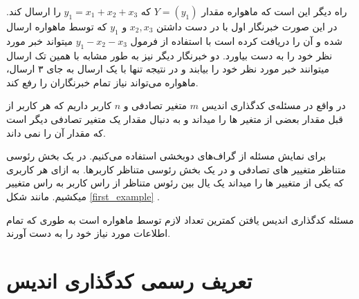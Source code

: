 راه دیگر این است که ماهواره مقدار
$Y = (y_1)$
که
$y_1 = x_1 + x_2 + x_3$
را ارسال کند. در این صورت خبرنگار اول با در دست داشتن
$x_2, x_3$
و 
$y_1$
که توسط ماهواره ارسال شده و آن را دریافت کرده است با استفاده از فرمول
$y_1 - x_2 - x_3$
میتواند خبر مورد نظر خود را به دست بیاورد. دو خبرنگار دیگر نیز به طور مشابه با همین تک ارسال میتوانند خبر مورد نظر خود را بیابند و در نتیجه تنها با یک ارسال به جای ۳ ارسال، ماهواره می‌تواند نیاز تمام خبرنگاران را رفع کند.

در واقع در مسئله‌ی کدگذاری اندیس
$m$
متغیر تصادفی و
$n$
کاربر داریم که هر کاربر از قبل مقدار بعضی از متغیر ها را میداند و به دنبال مقدار یک متغیر تصادفی دیگر است که مقدار آن را نمی داند.

برای نمایش مسئله از گراف‌های دوبخشی استفاده می‌کنیم. در یک بخش رئوسی متناظر متغییر های تصادفی و در یک بخش رئوسی متناظر کاربرها. به ازای هر کاربری که یکی از متغییر ها را میداند یک یال بین رئوس متناظر از راس کاربر به راس متغییر میکشیم. مانند شکل
\ref{first_example}
.

مسئله کدگذاری اندیس یافتن کمترین تعداد
لازم توسط ماهواره است به طوری که تمام 
اطلاعات مورد نیاز خود را به دست آورند.
\section{تعریف رسمی کدگذاری اندیس}

